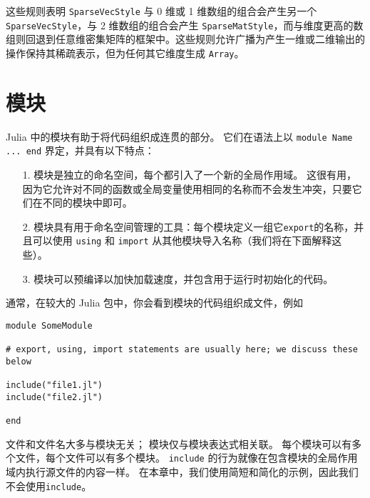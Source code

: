 这些规则表明 \texttt{SparseVecStyle} 与 0 维或 1 维数组的组合会产生另一个 \texttt{SparseVecStyle}，与 2 维数组的组合会产生 \texttt{SparseMatStyle}，而与维度更高的数组则回退到任意维密集矩阵的框架中。这些规则允许广播为产生一维或二维输出的操作保持其稀疏表示，但为任何其它维度生成 \texttt{Array}。



\hypertarget{10438697863683890874}{}


\chapter{模块}



Julia 中的模块有助于将代码组织成连贯的部分。 它们在语法上以 \texttt{module Name ... end} 界定，并具有以下特点：



\begin{itemize}
\item[1. ] 模块是独立的命名空间，每个都引入了一个新的全局作用域。 这很有用，因为它允许对不同的函数或全局变量使用相同的名称而不会发生冲突，只要它们在不同的模块中即可。


\item[2. ] 模块具有用于命名空间管理的工具：每个模块定义一组它\texttt{export}的名称，并且可以使用 \texttt{using} 和 \texttt{import} 从其他模块导入名称（我们将在下面解释这些）。


\item[3. ] 模块可以预编译以加快加载速度，并包含用于运行时初始化的代码。

\end{itemize}


通常，在较大的 Julia 包中，你会看到模块的代码组织成文件，例如




\begin{verbatim}
module SomeModule

# export, using, import statements are usually here; we discuss these below

include("file1.jl")
include("file2.jl")

end
\end{verbatim}



文件和文件名大多与模块无关； 模块仅与模块表达式相关联。 每个模块可以有多个文件，每个文件可以有多个模块。 \texttt{include} 的行为就像在包含模块的全局作用域内执行源文件的内容一样。 在本章中，我们使用简短和简化的示例，因此我们不会使用\texttt{include}。



